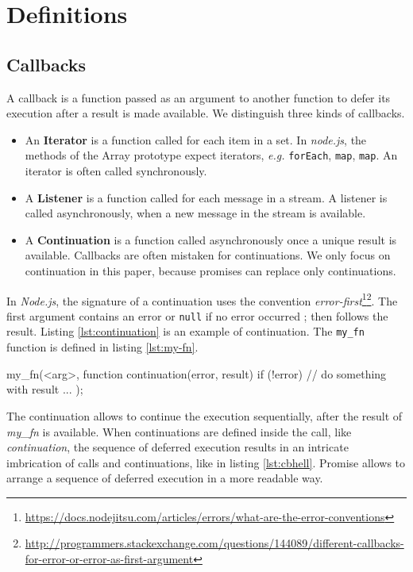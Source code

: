 \section{Definitions} \label{section:definitions}

\subsection{Callbacks} \label{section:definitions:callback}

A callback is a function passed as an argument to another function to defer its execution after a result is made available.
We distinguish three kinds of callbacks.
\begin{itemize}
  \item An \textbf{Iterator} is a function called for each item in a set.
  In \textit{node.js}, the methods of the Array prototype expect iterators, \textit{e.g.} \texttt{forEach}, \texttt{map}, \texttt{map}.
  An iterator is often called synchronously.
  \item A \textbf{Listener} is a function called for each message in a stream.
  A listener is called asynchronously, when a new message in the stream is available.
  \item A \textbf{Continuation} is a function called asynchronously once a unique result is available.
  Callbacks are often mistaken for continuations.
  We only focus on continuation in this paper, because promises can replace only continuations.
\end{itemize}

In \textit{Node.js}, the signature of a continuation uses the convention \textit{error-first}\footnote{\label{ftn:error-first}\url{https://docs.nodejitsu.com/articles/errors/what-are-the-error-conventions}}\footnote{\url{http://programmers.stackexchange.com/questions/144089/different-callbacks-for-error-or-error-as-first-argument}}.
The first argument contains an error or \texttt{null} if no error occurred ; then follows the result.
Listing \ref{lst:continuation} is an example of continuation.
The \texttt{my_fn} function is defined in listing \ref{lst:my-fn}.

\begin{code}[js, %
             caption={Example of a continuation}, %
             label={lst:continuation}] %
my_fn(<arg>, function continuation(error, result) {
  if (!error) {
    // do something with result ...
  }
});
\end{code}

The continuation allows to continue the execution sequentially, after the result of \textit{my_fn} is available. 
When continuations are defined inside the call, like \textit{continuation}, the sequence of deferred execution results in an intricate imbrication of calls and continuations, like in listing \ref{lst:cbhell}.
Promise allows to arrange a sequence of deferred execution in a more readable way.

